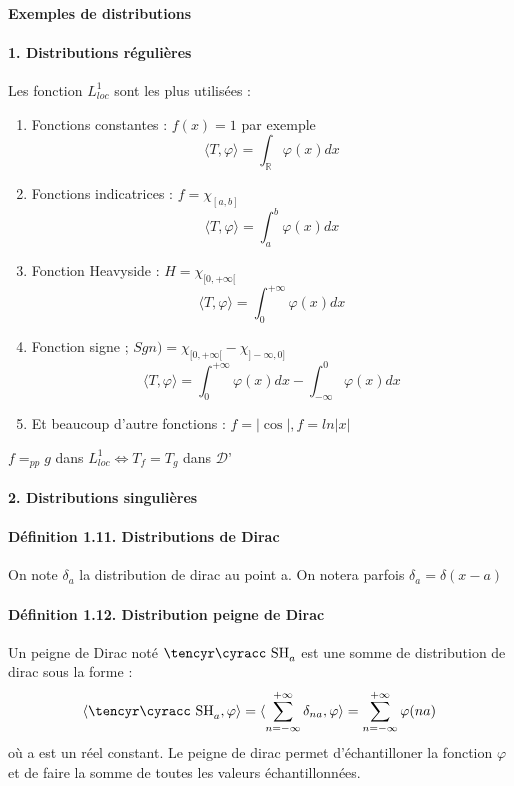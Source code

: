 \documentclass[12pt,a4paper]{report}
\newcommand{\ens}[1]{\ensuremath{\mathbb{#1}}}
\newcommand{\D}{\ensuremath{\mathcal{D}}}
\def\cyr{\tencyr\cyracc}
\def\dc{\mbox{\cyr SH}}
\begin{document}
\paragraph{Exemples de distributions}
\paragraph{1. Distributions régulières}
Les fonction \(L^1_{loc}\) sont les plus utilisées :
\begin{enumerate}
	\item Fonctions constantes : \(f(x) =1 \) par exemple
	\[
		\langle T, \varphi \rangle = \int_{\ens{R}} \varphi(x) dx
	\]
	\item Fonctions indicatrices : \(f = \chi_{[a,b]}\)
	\[
		\langle T, \varphi \rangle = \int_{a}^b \varphi(x) dx
	\]
	\item Fonction Heavyside : \(H = \chi_{[0,+\infty[}\)
	\[
		\langle T, \varphi \rangle = \int_{0}^{+\infty} \varphi(x) dx
	\]
	\item Fonction signe ; \(Sgn ) = \chi_{[0,+\infty[} - \chi_{]-\infty, 0]} \)
	\[
		\langle T, \varphi \rangle = \int_{0}^{+\infty} \varphi(x) dx - \int_{-\infty}^0 \varphi(x) dx
	\]
	\item Et beaucoup d'autre fonctions : \(f = \vert \cos \vert, f = ln \vert x \vert\)
\end{enumerate}

\(f =_{pp} g\) dans \(L^1_{loc} \Leftrightarrow T_f = T_g\) dans \D'

\paragraph{2. Distributions singulières}

\paragraph{Définition 1.11. Distributions de Dirac}
On note \(\delta_a\) la distribution de dirac au point a. On notera parfois \(\delta_a = \delta(x-a)\)

\paragraph{Définition 1.12. Distribution peigne de Dirac}
	Un peigne de Dirac noté \(\dc_a\) est une somme de distribution de dirac sous la forme :
	\[
		\langle \dc_a, \varphi \rangle = \langle \sum_{n = -\infty}^{+\infty} \delta_{na}, \varphi \rangle = \sum_{n = -\infty}^{+\infty} \varphi(na)
	\]
	où a est un réel constant. Le peigne de dirac permet d'échantilloner la fonction \(\varphi\) et de faire la somme de toutes les valeurs échantillonnées.
	
\end{document}
